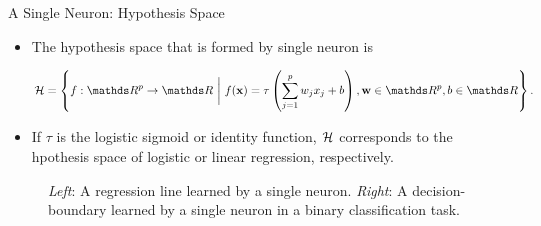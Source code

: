 
\begin{vbframe}{A Single Neuron: Hypothesis Space}
\begin{itemize}
\item The hypothesis space that is formed by single neuron %
is 
\begin{small}
$$\Hspace  = \left\{f: \R^p \to \R ~\bigg|~ \fx = \tau\left(\sum_{j = 1}^p w_j x_j + b\right), \wtw \in \R^p, b \in \R\right\}.$$ 
\end{small}
\item If $\tau$ is the logistic sigmoid or identity function, $\mathcal{H}$ corresponds to the hpothesis space of logistic or linear regression, respectively.
\end{itemize}
\vspace*{-0.45cm}
\begin{figure}
\centering
{}
\vspace*{-0.2cm}
\begin{tiny}
\caption{\textit{Left}: A regression line learned by a single neuron. \textit{Right}: A decision-boundary learned by a single neuron in a binary classification task.}
\end{tiny}
\end{figure}
\end{vbframe}

